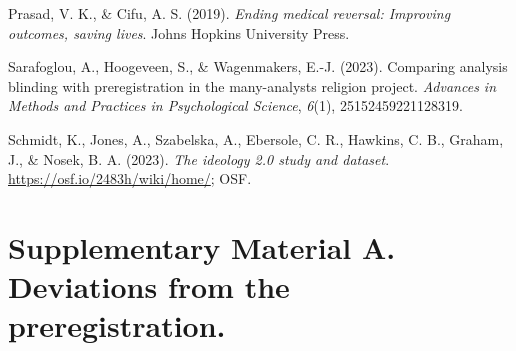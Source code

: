 \documentclass[
  man,floatsintext]{apa6}
\newlength{\cslhangindent}
\newlength{\cslentryspacingunit} %
\newenvironment{CSLReferences}[2] %
 {%
  \setlength{\parindent}{0pt}
  \ifodd #1
  \let\oldpar\par
  \def\par{\hangindent=\cslhangindent\oldpar}
  \fi
  \setlength{\parskip}{#2\cslentryspacingunit}
 }%
 {}
\begin{document}
\begin{CSLReferences}{1}{0}
\leavevmode{}%
Prasad, V. K., \& Cifu, A. S. (2019). \emph{Ending medical reversal: Improving outcomes, saving lives}. Johns Hopkins University Press.

\leavevmode{}%
Sarafoglou, A., Hoogeveen, S., \& Wagenmakers, E.-J. (2023). Comparing analysis blinding with preregistration in the many-analysts religion project. \emph{Advances in Methods and Practices in Psychological Science}, \emph{6}(1), 25152459221128319.

\leavevmode{}%
Schmidt, K., Jones, A., Szabelska, A., Ebersole, C. R., Hawkins, C. B., Graham, J., \& Nosek, B. A. (2023). \emph{The ideology 2.0 study and dataset}. \url{https://osf.io/2483h/wiki/home/}; OSF.

\end{CSLReferences}

\newpage

\hypertarget{supplementary-material-a.-deviations-from-the-preregistration.}{%
\section{Supplementary Material A. Deviations from the preregistration.}\label{supplementary-material-a.-deviations-from-the-preregistration.}}
\end{document}
